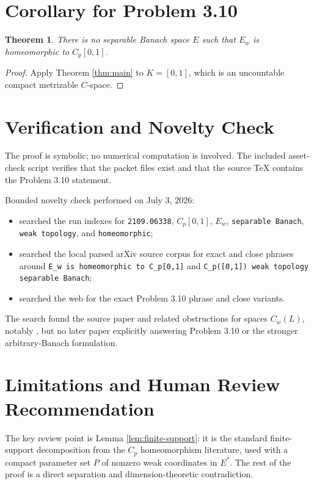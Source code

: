 \documentclass[11pt]{article}
\newtheorem{theorem}{Theorem}
\begin{document}
\section*{Corollary for Problem 3.10}

\begin{theorem}
There is no separable Banach space $E$ such that $E_w$ is homeomorphic to
$C_p[0,1]$.
\end{theorem}

\begin{proof}
Apply Theorem \ref{thm:main} to $K=[0,1]$, which is an uncountable compact
metrizable $C$-space.
\end{proof}

\section*{Verification and Novelty Check}

The proof is symbolic; no numerical computation is involved. The included
asset-check script verifies that the packet files exist and that the source
TeX contains the Problem 3.10 statement.

Bounded novelty check performed on July 3, 2026:
\begin{itemize}
\item searched the run indexes for \texttt{2109.06338}, $C_p[0,1]$, $E_w$,
\texttt{separable Banach}, \texttt{weak topology}, and \texttt{homeomorphic};
\item searched the local parsed arXiv source corpus for exact and close
phrases around \texttt{E\_w is homeomorphic to C\_p[0,1]} and
\texttt{C\_p([0,1]) weak topology separable Banach};
\item searched the web for the exact Problem 3.10 phrase and close variants.
\end{itemize}
The search found the source paper and related obstructions for spaces
$C_w(L)$, notably \cite{KrupskiWeakPointwise}, but no later paper explicitly
answering Problem 3.10 or the stronger arbitrary-Banach formulation.

\section*{Limitations and Human Review Recommendation}

The key review point is Lemma \ref{lem:finite-support}: it is the standard
finite-support decomposition from the $C_p$ homeomorphism literature, used
with a compact parameter set $P$ of nonzero weak coordinates in $E^*$. The
rest of the proof is a direct separation and dimension-theoretic contradiction.
\end{document}
